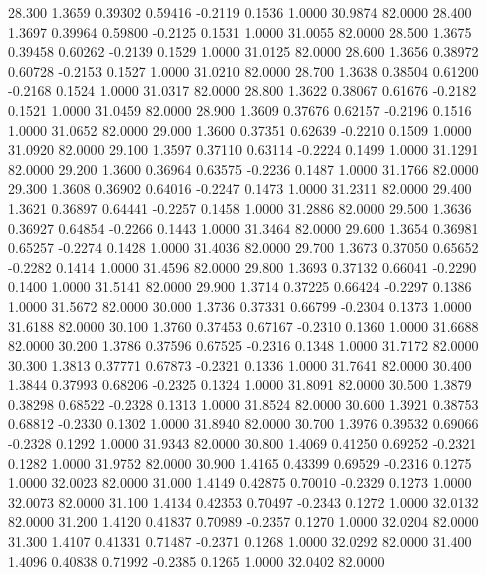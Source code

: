   28.300   1.3659   0.39302   0.59416  -0.2119   0.1536   1.0000  30.9874  82.0000
  28.400   1.3697   0.39964   0.59800  -0.2125   0.1531   1.0000  31.0055  82.0000
  28.500   1.3675   0.39458   0.60262  -0.2139   0.1529   1.0000  31.0125  82.0000
  28.600   1.3656   0.38972   0.60728  -0.2153   0.1527   1.0000  31.0210  82.0000
  28.700   1.3638   0.38504   0.61200  -0.2168   0.1524   1.0000  31.0317  82.0000
  28.800   1.3622   0.38067   0.61676  -0.2182   0.1521   1.0000  31.0459  82.0000
  28.900   1.3609   0.37676   0.62157  -0.2196   0.1516   1.0000  31.0652  82.0000
  29.000   1.3600   0.37351   0.62639  -0.2210   0.1509   1.0000  31.0920  82.0000
  29.100   1.3597   0.37110   0.63114  -0.2224   0.1499   1.0000  31.1291  82.0000
  29.200   1.3600   0.36964   0.63575  -0.2236   0.1487   1.0000  31.1766  82.0000
  29.300   1.3608   0.36902   0.64016  -0.2247   0.1473   1.0000  31.2311  82.0000
  29.400   1.3621   0.36897   0.64441  -0.2257   0.1458   1.0000  31.2886  82.0000
  29.500   1.3636   0.36927   0.64854  -0.2266   0.1443   1.0000  31.3464  82.0000
  29.600   1.3654   0.36981   0.65257  -0.2274   0.1428   1.0000  31.4036  82.0000
  29.700   1.3673   0.37050   0.65652  -0.2282   0.1414   1.0000  31.4596  82.0000
  29.800   1.3693   0.37132   0.66041  -0.2290   0.1400   1.0000  31.5141  82.0000
  29.900   1.3714   0.37225   0.66424  -0.2297   0.1386   1.0000  31.5672  82.0000
  30.000   1.3736   0.37331   0.66799  -0.2304   0.1373   1.0000  31.6188  82.0000
  30.100   1.3760   0.37453   0.67167  -0.2310   0.1360   1.0000  31.6688  82.0000
  30.200   1.3786   0.37596   0.67525  -0.2316   0.1348   1.0000  31.7172  82.0000
  30.300   1.3813   0.37771   0.67873  -0.2321   0.1336   1.0000  31.7641  82.0000
  30.400   1.3844   0.37993   0.68206  -0.2325   0.1324   1.0000  31.8091  82.0000
  30.500   1.3879   0.38298   0.68522  -0.2328   0.1313   1.0000  31.8524  82.0000
  30.600   1.3921   0.38753   0.68812  -0.2330   0.1302   1.0000  31.8940  82.0000
  30.700   1.3976   0.39532   0.69066  -0.2328   0.1292   1.0000  31.9343  82.0000
  30.800   1.4069   0.41250   0.69252  -0.2321   0.1282   1.0000  31.9752  82.0000
  30.900   1.4165   0.43399   0.69529  -0.2316   0.1275   1.0000  32.0023  82.0000
  31.000   1.4149   0.42875   0.70010  -0.2329   0.1273   1.0000  32.0073  82.0000
  31.100   1.4134   0.42353   0.70497  -0.2343   0.1272   1.0000  32.0132  82.0000
  31.200   1.4120   0.41837   0.70989  -0.2357   0.1270   1.0000  32.0204  82.0000
  31.300   1.4107   0.41331   0.71487  -0.2371   0.1268   1.0000  32.0292  82.0000
  31.400   1.4096   0.40838   0.71992  -0.2385   0.1265   1.0000  32.0402  82.0000
